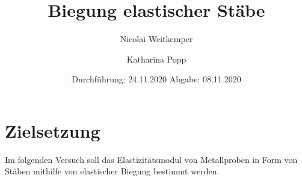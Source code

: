 

\subject{V103}
\title{Biegung elastischer Stäbe}
\author{Nicolai Weitkemper \and Katharina Popp}
\date{
    Durchführung: 24.11.2020
    \hspace{3em}
    Abgabe: 08.11.2020
}



\maketitle
\thispagestyle{empty}
\tableofcontents
\newpage


\section{Zielsetzung} \label{sec:Ziel}

    Im folgenden Versuch soll das Elastizitätsmodul von Metallproben in Form von
    Stäben mithilfe von elastischer Biegung bestimmt werden.


\newpage


\newpage




